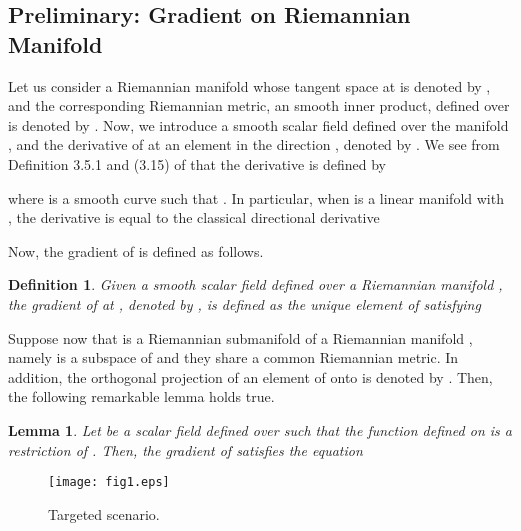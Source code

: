 \documentclass[conference,letterpaper]{ieeeconf}
\newtheorem{lemma}{Lemma}
\newtheorem{definition}{Definition}
\begin{document}
\subsection*{Preliminary: Gradient on Riemannian Manifold}








Let us consider a Riemannian manifold  whose
tangent space at  is denoted by ,
and the corresponding Riemannian metric, an smooth inner product, 
defined over  is denoted by .
Now, we introduce a smooth scalar field  defined over the manifold ,
and the derivative of  at an element  in the direction ,
denoted by .
We see from Definition 3.5.1 and (3.15) of \cite{AMS_BK}
that the derivative  is defined by

where  is a smooth curve
such that .
In particular, when  is a linear manifold with ,
 the derivative  is equal to the classical directional derivative




Now, the gradient of 
is defined as follows.
\begin{definition}\cite{AMS_BK}
\label{def:grad_M}
Given a smooth scalar field  defined over a Riemannian manifold ,
the gradient  of  at , denoted by , is defined as the unique
element of  satisfying

\end{definition}
Suppose now that  is a Riemannian 
submanifold of a Riemannian manifold ,
namely  is a subspace of  and
they share a common Riemannian metric.
In addition, the orthogonal projection of an element of 
onto  is denoted by .
Then, the following remarkable lemma holds true.
\begin{lemma}\cite{AMS_BK}
\label{lem:grad_proj}
Let  be a scalar field defined over 
such that the function  defined on  
is a restriction of .
Then, the gradient of  satisfies the equation

\end{lemma}













\begin{figure}[t]
\begin{center}
\texttt{[image: fig1.eps]}
\caption{Targeted scenario.}
\label{fig:scenario}
\end{center}
\end{figure}
\end{document}
